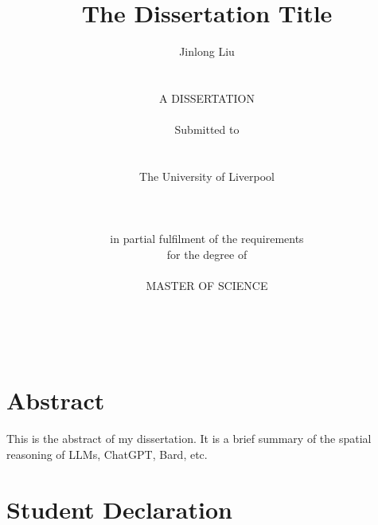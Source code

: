 \documentclass[a4paper,11pt]{report}
\begin{document}



\thispagestyle{empty}  %

\title{\LARGE
The Dissertation Title}

\author{Jinlong Liu
\\    \\    \\
A DISSERTATION
\\    \\
Submitted to 
\\    \\    \\ 
The University of Liverpool
\\    \\
\\    \\
in partial fulfilment of the requirements
\\
for the degree of 
\\     \\
MASTER OF SCIENCE
\\     \\    \\    \\
}


\date{}


\maketitle


\chapter*{\center Abstract}

This is the abstract of my dissertation.  It is a brief summary of the spatial reasoning of LLMs, ChatGPT, Bard, etc.

\newpage



\chapter*{\center Student Declaration} 
\end{document}
